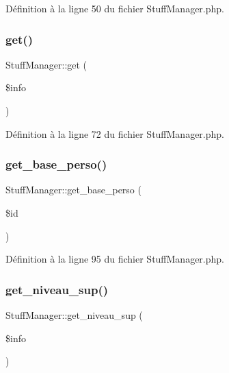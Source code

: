 Définition à la ligne 50 du fichier Stuff\+Manager.\+php.

\mbox{\label{class_stuff_manager_a4475df7ca91c484fb5140888b9d88b46}} 
\subsubsection{\texorpdfstring{get()}{get()}}
{\footnotesize\ttfamily Stuff\+Manager\+::get (\begin{DoxyParamCaption}\item[{}]{\$info }\end{DoxyParamCaption})}



Définition à la ligne 72 du fichier Stuff\+Manager.\+php.

\mbox{\label{class_stuff_manager_a3cf88e6685c20da28e89ae03dd76943a}} 
\subsubsection{\texorpdfstring{get\+\_\+base\+\_\+perso()}{get\_base\_perso()}}
{\footnotesize\ttfamily Stuff\+Manager\+::get\+\_\+base\+\_\+perso (\begin{DoxyParamCaption}\item[{}]{\$id }\end{DoxyParamCaption})}



Définition à la ligne 95 du fichier Stuff\+Manager.\+php.

\mbox{\label{class_stuff_manager_a399af828a28e5a36c7255ce7d8671f26}} 
\subsubsection{\texorpdfstring{get\+\_\+niveau\+\_\+sup()}{get\_niveau\_sup()}}
{\footnotesize\ttfamily Stuff\+Manager\+::get\+\_\+niveau\+\_\+sup (\begin{DoxyParamCaption}\item[{}]{\$info }\end{DoxyParamCaption})}



